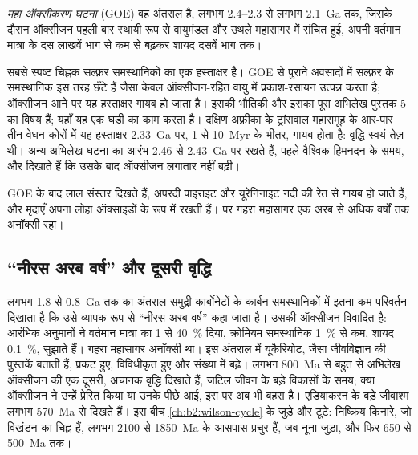 \begin{definition}\label{def:b2:precambrian-earth:goe}
\emph{महा ऑक्सीकरण घटना} (GOE) वह अंतराल है, लगभग
2.4--2.3 से लगभग \qty{2.1}{Ga} तक, जिसके दौरान ऑक्सीजन पहली बार स्थायी रूप से वायुमंडल
और उथले महासागर में संचित हुई, अपनी वर्तमान मात्रा के दस लाखवें भाग से कम से बढ़कर
शायद दसवें भाग तक।
\end{definition}

सबसे स्पष्ट चिह्नक सल्फ़र समस्थानिकों का एक हस्ताक्षर है। GOE से पुराने अवसादों में
सल्फ़र के समस्थानिक इस तरह छँटे हैं जैसा केवल ऑक्सीजन-रहित वायु में प्रकाश-रसायन
उत्पन्न करता है; ऑक्सीजन आने पर यह हस्ताक्षर गायब हो जाता है। इसकी भौतिकी और इसका पूरा अभिलेख
पुस्तक 5 का विषय हैं; यहाँ यह एक घड़ी का काम करता है। दक्षिण अफ़्रीका के ट्रांसवाल
महासमूह के आर-पार तीन वेधन-कोरों में यह हस्ताक्षर \qty{2.33}{Ga} पर, 1 से \qty{10}{Myr} के भीतर, गायब होता है:
वृद्धि स्वयं तेज़ थी। अन्य अभिलेख घटना का आरंभ 2.46 से \qty{2.43}{Ga} पर रखते हैं,
पहले वैश्विक हिमनदन के समय, और दिखाते हैं कि उसके बाद ऑक्सीजन
लगातार नहीं बढ़ी।

GOE के बाद लाल संस्तर दिखते हैं, अपरदी पाइराइट और यूरेनिनाइट नदी की रेत से गायब हो जाते हैं,
और मृदाएँ अपना लोहा ऑक्साइडों के रूप में रखती हैं। पर गहरा महासागर एक अरब से अधिक
वर्षों तक अनॉक्सी रहा।

\subsection*{``नीरस अरब वर्ष'' और दूसरी वृद्धि}

लगभग 1.8 से \qty{0.8}{Ga} तक का अंतराल समुद्री कार्बोनेटों के कार्बन समस्थानिकों में इतना कम परिवर्तन दिखाता है
कि उसे व्यापक रूप से ``नीरस अरब वर्ष'' कहा जाता है। उसकी ऑक्सीजन विवादित है: आरंभिक
अनुमानों ने वर्तमान मात्रा का 1 से \qty{40}{\percent} दिया, क्रोमियम समस्थानिक
\qty{1}{\percent} से कम, शायद \qty{0.1}{\percent}, सुझाते हैं। गहरा महासागर अनॉक्सी था। इस अंतराल में
यूकैरियोट, जैसा जीवविज्ञान की पुस्तकें बताती हैं, प्रकट हुए, विविधीकृत हुए और संख्या में बढ़े। लगभग \qty{800}{Ma} से बहुत से अभिलेख
ऑक्सीजन की एक दूसरी, अचानक वृद्धि दिखाते हैं, जटिल जीवन के बड़े विकासों के समय; क्या
ऑक्सीजन ने उन्हें प्रेरित किया या उनके पीछे आई, इस पर अब भी बहस है। एडियाकरन के बड़े जीवाश्म
लगभग \qty{570}{Ma} से दिखते हैं। इस बीच \cref{ch:b2:wilson-cycle} के 
जुड़े और टूटे: निष्क्रिय किनारे, जो विखंडन का चिह्न हैं, लगभग 2100 से
\qty{1850}{Ma} के आसपास प्रचुर हैं, जब नूना जुड़ा, और फिर 650 से \qty{500}{Ma} तक।

